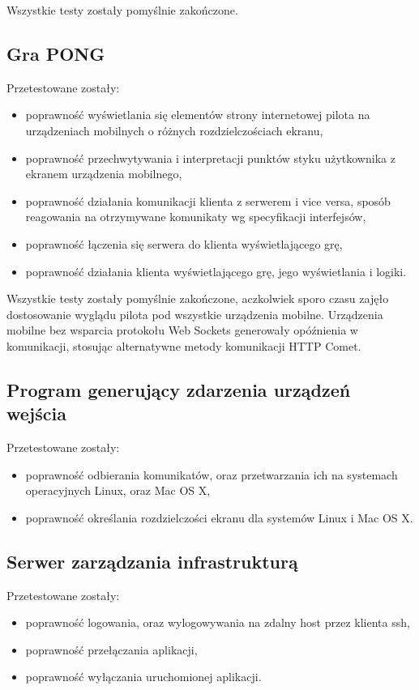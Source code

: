 Wszystkie testy zostały pomyślnie zakończone.

\subsection{Gra PONG}

Przetestowane zostały:

\begin{itemize}
	\item poprawność wyświetlania się elementów strony internetowej pilota na urządzeniach mobilnych o różnych rozdzielczościach ekranu,
	\item poprawność przechwytywania i interpretacji punktów styku użytkownika z ekranem urządzenia mobilnego,
	\item poprawność działania komunikacji klienta z serwerem i vice versa, sposób reagowania na otrzymywane komunikaty wg specyfikacji interfejsów,
	\item poprawność łączenia się serwera do klienta wyświetlającego grę,
	\item poprawność działania klienta wyświetlającego grę, jego wyświetlania i logiki.
\end{itemize}

Wszystkie testy zostały pomyślnie zakończone, aczkolwiek sporo czasu zajęło dostosowanie wyglądu pilota pod wszystkie urządzenia mobilne. Urządzenia mobilne bez wsparcia protokołu Web Sockets generowały opóźnienia w komunikacji, stosując alternatywne metody komunikacji HTTP Comet.

\subsection{Program generujący zdarzenia urządzeń wejścia}
Przetestowane zostały:
\begin{itemize}
	\item poprawność odbierania komunikatów, oraz przetwarzania ich na systemach operacyjnych Linux, oraz Mac OS X,
	\item poprawność określania rozdzielczości ekranu dla systemów Linux i Mac OS X.
\end{itemize}

\subsection{Serwer zarządzania infrastrukturą}

Przetestowane zostały:
\begin{itemize}
	\item poprawność logowania, oraz wylogowywania na zdalny host przez klienta ssh,
	\item poprawność przełączania aplikacji,
	\item poprawność wyłączania uruchomionej aplikacji.
\end{itemize}

